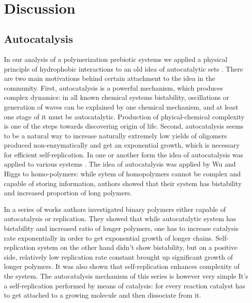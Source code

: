 \documentclass[journal=jacsat,manuscript=article,layout=twocolumn]{achemso}
\begin{document}
\,\\
\.\\
\,\\
\,\newline\\


\section{Discussion}

\subsection{Autocatalysis}
  In our analysis of a polymerization prebiotic systems we applied a physical principle of 
hydrophobic interactions to an old idea  of autocatalytic sets \cite{Kauffman1986,Eigen1978}. There are two main 
motivations behind certain attachment to the idea in the community. First, autocatalysis is a powerful mechanism, which 
produces complex dynamics: in all known chemical systems bistability, oscillations or generation of waves can be 
explained by one chemical mechanism, and at least one stage of it must be autocatalytic\cite{Prigozhin1990}. Production 
of phyical-chemical complexity is one of the steps towards discovering origin of life. Second, autocatalysis seems to be 
a natural way to increase naturally extremely low yields of oligomers produced non-enzymatically and get an 
exponential growth, which is necessary for efficient self-replication. In one or another form the idea of 
autocatalysis was applied to various systems 
\cite{segre1998graded,nowak2008prevolutionary,Wu2009,Hordijk2010,Walker2012,Chen2012,Markovitch2012}. The idea of 
autocatalysis was applied by Wu and Higgs to homo-polymers: while sytem of homopolymers cannot be 
complex and capable of storing information, authors showed that their system has bistability and 
increased proportion of long polymers. 

In a series of works 
\cite{nowak2008prevolutionary,Ohtsuki2009,Chen2012,Derr2012} authors investigated binary polymers 
either capable of autocatalysis or replication. They showed that while autocatalytic system has 
bistability and increased ratio of longer polymers, one has to increase catalysis rate 
exponentially in order to get exponential growth of longer chains. Self-replication system on the 
other hand didn't show bistability, but on a positive side, relatively low replication rate 
constant brought up significant growth of longer polymers. It was also shown that self-replication 
enhances complexity of the system. The autocatalysis mechanism of this series is however very 
simple It's a self-replication performed by means of catalysis: for every reaction catalyst has to 
get attached to a growing molecule and then dissociate from it.
\end{document}
